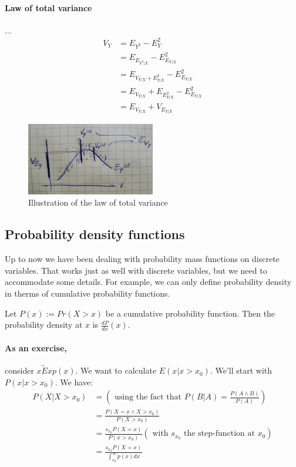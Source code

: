 \paragraph{Law of total variance} ...
\begin{equation} \label{lawOfTotalVariance}
    \begin{aligned}
        V_Y &= E_{Y^2} - E_Y^2 \\
            &= E_{E_{Y^2 | X}} - E^2_{E_{Y|X}} \\
            &= E_{  V_{Y|X} + E^2_{Y|X}  } - E^2_{E_{Y|X}} \\
            &= E_{V_{Y|X}} + E_{E^2_{Y|X}} - E^2_{E_{Y|X}} \\
            &= E_{V_{Y|X}} + V_{E_{Y|X}}
    \end{aligned}
\end{equation}


\begin{figure}[h]
    \caption{Illustration of the law of total variance}
    \centering
      \includegraphics[width=0.5\textwidth]{images/law_of_total_variance.jpg}
\end{figure}
 
 
\subsection{Probability density functions}
Up to now we have been dealing with probability mass functions on discrete variables.
That works just as well with discrete variables, but we need to accommodate some details.
For example, we can only define probability density in therms of cumulative probability functions.

Let $P(x) := Pr(X > x)$ be a cumulative probability function.
Then the probability density at $x$ is $\frac{d P}{d x}(x)$.

\paragraph{As an exercise,} consider $x \tilde Exp(x)$. We want to calculate $E(x | x > x_0)$. 
We'll start with $P(x | x > x_0)$.
We have:
\begin{equation}
    \begin{aligned}
        P(X | X > x_0) &= \left( \text{ using the fact that } P(B|A) = \frac{P(A \land B)}{P(A)} \right) \\
                          &= \frac{ P(X = x \land X > x_0) }{ P(X > x_0) } \\
                          &= \frac{ s_{x_0} P(X=x) }{ P(x > x_0) }  (\text{ with $s_{x_0}$ the step-function at $x_0$}) \\
                          &= \frac{ s_{x_0} P(X=x) }{ \int_{x_0}^\infty p(x) dx }
    \end{aligned}
\end{equation}

